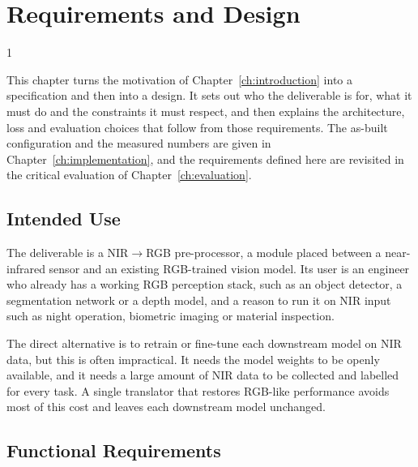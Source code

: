 \doublespacing %

\chapter{Requirements and Design}
\label{ch:requirements}
\label{ch:design}

\begin{spacing}{1} %
\minitoc %
\end{spacing} %
\thesisspacing %

This chapter turns the motivation of Chapter~\ref{ch:introduction} into a specification and then into a design. It sets out who the deliverable is for, what it must do and the constraints it must respect, and then explains the architecture, loss and evaluation choices that follow from those requirements. The as-built configuration and the measured numbers are given in Chapter~\ref{ch:implementation}, and the requirements defined here are revisited in the critical evaluation of Chapter~\ref{ch:evaluation}.

\section{Intended Use}
\label{sec:req_stakeholders}

The deliverable is a NIR$\rightarrow$RGB pre-processor, a module placed between a near-infrared sensor and an existing RGB-trained vision model. Its user is an engineer who already has a working RGB perception stack, such as an object detector, a segmentation network or a depth model, and a reason to run it on NIR input such as night operation, biometric imaging or material inspection.

The direct alternative is to retrain or fine-tune each downstream model on NIR data, but this is often impractical. It needs the model weights to be openly available, and it needs a large amount of NIR data to be collected and labelled for every task. A single translator that restores RGB-like performance avoids most of this cost and leaves each downstream model unchanged.

\section{Functional Requirements}
\label{sec:req_functional}

